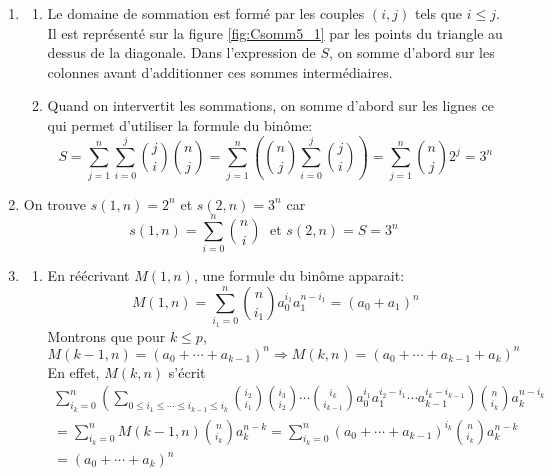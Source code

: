 \begin{enumerate}
  \item 
  \begin{enumerate}
    \item Le domaine de sommation est formé par les couples $(i,j)$ tels que $i\leq j$. Il est représenté sur la figure \ref{fig:Csomm5_1} par les points du triangle au dessus de la diagonale. Dans l'expression de $S$, on somme d'abord sur les colonnes avant d'additionner ces sommes intermédiaires.
    \item Quand on intervertit les sommations, on somme d'abord sur les lignes ce qui permet d'utiliser la formule du binôme:
\begin{displaymath}
S = \sum_{j=1}^{n}\sum_{i=0}^{j}\binom{j}{i}\binom{n}{j}  
= \sum_{j=1}^{n}\left( \binom{n}{j}\sum_{i=0}^{j}\binom{j}{i}\right) 
= \sum_{j=1}^{n}\binom{n}{j}2^j = 3^n
\end{displaymath}
  \end{enumerate}

  \item On trouve $s(1,n)=2^n$ et $s(2,n)=3^n$ car
\begin{displaymath}
  s(1,n) = \sum_{i=0}^n\binom{n}{i}\;\text{ et } s(2,n) = S = 3^n
\end{displaymath}

\item
\begin{enumerate}
  \item En réécrivant $M(1,n)$, une formule du binôme apparait:
\begin{displaymath}
M(1,n) = \sum_{i_1=0}^{n}\binom{n}{i_1}a_0^{i_1}a_1^{n-i_1} = (a_0 + a_1)^n  
\end{displaymath}
Montrons que pour $k\leq p$,
\begin{displaymath}
  M(k-1,n)=(a_0 + \cdots + a_{k-1})^n \Rightarrow M(k,n)=(a_0 + \cdots + a_{k-1} + a_k)^n
\end{displaymath}
En effet, $M(k,n)$ s'écrit 
\begin{multline*}
\sum_{i_k=0}^{n}
\left( 
\sum_{ 0\leq i_1 \leq \cdots \leq i_{k-1} \leq i_k}
\binom{i_2}{i_1}\binom{i_3}{i_2}\cdots \binom{i_k}{i_{k-1}}
a_0^{i_1}a_1^{i_2-i_1}\cdots a_{k-1}^{i_k - i_{k-1}}
\right)
\binom{n}{i_k}a_k^{n-i_k} \\
= \sum_{i_k=0}^{n} M(k-1,n)\binom{n}{i_k}a_k^{n-k} 
= \sum_{i_k=0}^{n} (a_0+\cdots+a_{k-1})^{i_k}\binom{n}{i_k}a_k^{n-k}\\
= (a_0 + \cdots + a_{k})^n
\end{multline*}


\end{enumerate}
\end{enumerate}
